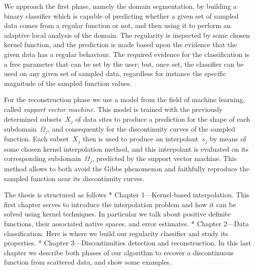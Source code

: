 We approach the first phase, namely the domain segmentation, by building a binary classifier which is capable of predicting whether a given set of sampled data comes from a regular function or not, and then using it to perform an adaptive local analysis of the domain.  The regularity is inspected by some chosen kernel function, and the prediction is made based upon the evidence that the given data has a regular behaviour.  The required evidence for the classification is a free parameter that can be set by the user;  but, once set, the classifier can be used on any given set of sampled data, regardless for instance the specific magnitude of the sampled function values.



For the reconstruction phase we use a model from the field of machine learning, called {\em support vector machine}.
This model is trained with the  previously determined subsets~$X_j$ of data sites to produce a prediction for the shape of each subdomain~$Ω_j$, and consequently for the discontinuity curves of the sampled function.  Each subset~$X_j$ then is used to produce an interpolant~$s_j$ by means of some chosen kernel interpolation method, and this interpolant is evaluated on its corresponding subdomain~$Ω_j$, predicted by the support vector machine.  This method allows  to both avoid the Gibbs phenomenon and faithfully reproduce the sampled function near its discontinuity curves.



The thesis is structured as follows
\begitems
* Chapter 1---Kernel-based interpolation.  This first chapter serves to introduce the interpolation problem and how it can be solved using kernel techniques. In particular we talk about positive definite functions, their associated native spaces, and error estimates.
* Chapter 2---Data classification.  Here is where we build our regularity classifier and study its properties.
* Chapter 3---Discontinuities detection and reconstruction. In this last chapter we describe both phases of our algorithm to recover a discontinuous function from scattered data, and show some examples.
\enditems





